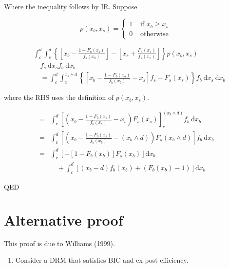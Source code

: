 \documentclass[10pt]{article}
\begin{document}
Where the inequality follows by IR. Suppose

$$
p\left(x_{b}, x_{s}\right)= \begin{cases}1 & \text { if } x_{b} \geq x_{s} \\ 0 & \text { otherwise }\end{cases}
$$

$$
\begin{aligned}
& \int_{c}^{d} \int_{c}^{d}\left\{\left[x_{b}-\frac{1-F_{b}\left(x_{b}\right)}{f_{b}\left(x_{b}\right)}\right]-\left[x_{s}+\frac{F_{s}\left(x_{s}\right)}{f_{s}\left(x_{s}\right)}\right]\right\} p\left(x_{b}, x_{s}\right) \\
& \quad f_{s} \mathrm{~d} x_{s} f_{b} \mathrm{~d} x_{b} \\
& \quad=\int_{c}^{d} \int_{c}^{x_{b} \wedge d}\left\{\left[x_{b}-\frac{1-F_{b}\left(x_{b}\right)}{f_{b}\left(x_{b}\right)}-x_{s}\right] f_{s}-F_{s}\left(x_{s}\right)\right\} f_{b} \mathrm{~d} x_{s} \mathrm{~d} x_{b}
\end{aligned}
$$

where the RHS uses the definition of $p\left(x_{b}, x_{s}\right)$.

$$
\begin{aligned}
= & \int_{c}^{d}\left[\left(x_{b}-\frac{1-F_{b}\left(x_{b}\right)}{f_{b}\left(x_{b}\right)}-x_{s}\right) F_{s}\left(x_{s}\right)\right]_{c}^{\left(x_{b} \wedge d\right)} f_{b} \mathrm{~d} x_{b} \\
= & \int_{c}^{d}\left[\left(x_{b}-\frac{1-F_{b}\left(x_{b}\right)}{f_{b}\left(x_{b}\right)}-\left(x_{b} \wedge d\right)\right) F_{s}\left(x_{b} \wedge d\right)\right] f_{b} \mathrm{~d} x_{b} \\
= & \int_{c}^{d}\left[-\left[1-F_{b}\left(x_{b}\right)\right] F_{s}\left(x_{b}\right)\right] \mathrm{d} x_{b} \\
& \quad+\int_{c}^{d}\left[\left(x_{b}-d\right) f_{b}\left(x_{b}\right)+\left(F_{b}\left(x_{b}\right)-1\right)\right] \mathrm{d} x_{b}
\end{aligned}
$$

QED

\section*{Alternative proof}
This proof is due to Williams (1999).

\begin{enumerate}
  \item Consider a DRM that satisfies BIC and ex post efficiency.
\end{enumerate}
\end{document}
